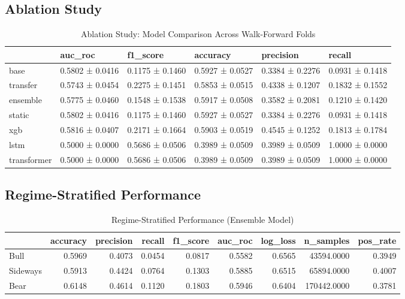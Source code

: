\documentclass[12pt,a4paper]{article}
\begin{document}
\subsection{Ablation Study}

\begin{table}
\caption{Ablation Study: Model Comparison Across Walk-Forward Folds}
\label{tab:ablation}
\begin{tabular}{llllll}
\toprule
 & auc_roc & f1_score & accuracy & precision & recall \\
\midrule
base & 0.5802 ± 0.0416 & 0.1175 ± 0.1460 & 0.5927 ± 0.0527 & 0.3384 ± 0.2276 & 0.0931 ± 0.1418 \\
transfer & 0.5743 ± 0.0454 & 0.2275 ± 0.1451 & 0.5853 ± 0.0515 & 0.4338 ± 0.1207 & 0.1832 ± 0.1552 \\
ensemble & 0.5775 ± 0.0460 & 0.1548 ± 0.1538 & 0.5917 ± 0.0508 & 0.3582 ± 0.2081 & 0.1210 ± 0.1420 \\
static & 0.5802 ± 0.0416 & 0.1175 ± 0.1460 & 0.5927 ± 0.0527 & 0.3384 ± 0.2276 & 0.0931 ± 0.1418 \\
xgb & 0.5816 ± 0.0407 & 0.2171 ± 0.1664 & 0.5903 ± 0.0519 & 0.4545 ± 0.1252 & 0.1813 ± 0.1784 \\
lstm & 0.5000 ± 0.0000 & 0.5686 ± 0.0506 & 0.3989 ± 0.0509 & 0.3989 ± 0.0509 & 1.0000 ± 0.0000 \\
transformer & 0.5000 ± 0.0000 & 0.5686 ± 0.0506 & 0.3989 ± 0.0509 & 0.3989 ± 0.0509 & 1.0000 ± 0.0000 \\
\bottomrule
\end{tabular}
\end{table}


\subsection{Regime-Stratified Performance}

\begin{table}
\caption{Regime-Stratified Performance (Ensemble Model)}
\label{tab:regime}
\begin{tabular}{lrrrrrrrr}
\toprule
 & accuracy & precision & recall & f1_score & auc_roc & log_loss & n_samples & pos_rate \\
\midrule
Bull & 0.5969 & 0.4073 & 0.0454 & 0.0817 & 0.5582 & 0.6565 & 43594.0000 & 0.3949 \\
Sideways & 0.5913 & 0.4424 & 0.0764 & 0.1303 & 0.5885 & 0.6515 & 65894.0000 & 0.4007 \\
Bear & 0.6148 & 0.4614 & 0.1120 & 0.1803 & 0.5946 & 0.6404 & 170442.0000 & 0.3781 \\
\bottomrule
\end{tabular}
\end{table}
\end{document}
